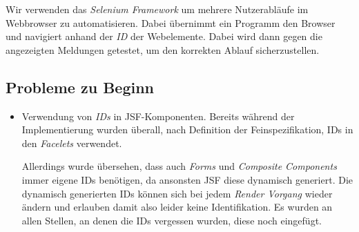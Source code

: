 
Wir verwenden das \emph{Selenium Framework} um mehrere Nutzerabläufe im Webbrowser zu automatisieren.
Dabei übernimmt ein Programm den Browser und navigiert anhand der \emph{ID}
der Webelemente. Dabei wird dann gegen die angezeigten Meldungen getestet, um
den korrekten Ablauf sicherzustellen.

\subsection{Probleme zu Beginn}

\begin{itemize}
	\item Verwendung von \emph{IDs} in JSF-Komponenten. Bereits während der
	Implementierung wurden überall, nach Definition der Feinspezifikation, IDs in den \emph{Facelets} verwendet.

	Allerdings wurde übersehen, dass auch \emph{Forms} und \emph{Composite Components} immer eigene IDs benötigen, da ansonsten JSF diese dynamisch
	generiert. Die dynamisch generierten IDs können sich bei jedem \emph{Render Vorgang} wieder ändern und erlauben damit also leider keine Identifikation.\newline
	Es wurden an allen Stellen, an denen die IDs vergessen wurden, diese noch eingefügt.



\end{itemize}